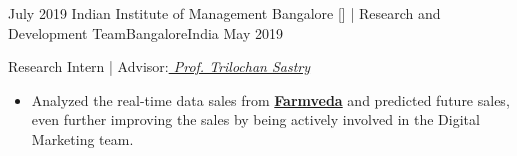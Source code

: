 \begin{experiences}
{\begin{itemize}
                      \end{itemize}
                    }{}
  \emptySeparator
    \experience
    {July 2019}   {Indian Institute of Management Bangalore [\href{https://www.iimb.ac.in/home}{\textcolor{basecolor}{\faGlobe}}] | Research and Development Team}{Bangalore}{India}
    {May 2019} {
                    Research Intern | Advisor:\textit{\href{https://www.iimb.ac.in/user/138/trilochan-sastry}{\textcolor{basecolor}{ Prof.  Trilochan Sastry}}
                    }
                      \begin{itemize}
                        \item Analyzed the real-time data sales from \href{https://farmveda.in/?srsltid=AfmBOooAQs3NRcPk3ubLxGLKAerFbtsEoWFYjBDqH3DeC9mPPuLLVehq}{\textbf{Farmveda}} and predicted future sales, even further improving the sales by being actively involved in the Digital Marketing team.
                      \end{itemize}
                    }{}
    

\end{experiences}
